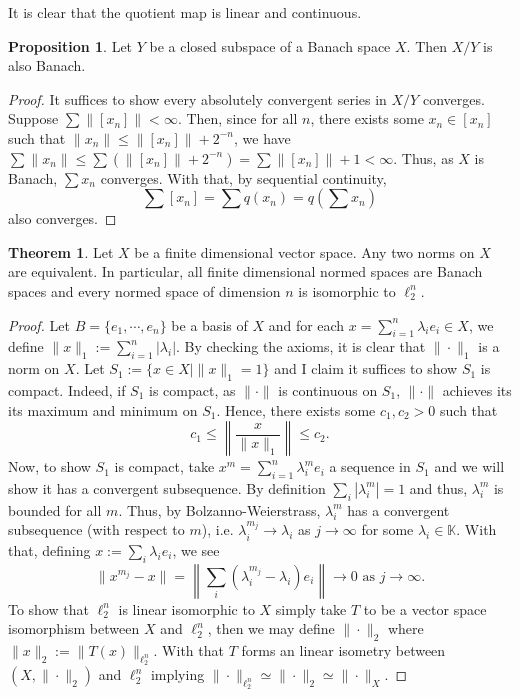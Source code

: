 \documentclass[
]{article}
\theoremstyle{definition}
\newtheorem{theorem}{Theorem}
\theoremstyle{definition}
\newtheorem{proposition}{Proposition}[section]
\begin{document}
It is clear that the quotient map is linear and continuous.

\begin{proposition}
  Let \(Y\) be a closed subspace of a Banach space \(X\). Then \(X / Y\) is also 
  Banach.
\end{proposition}
\begin{proof}
  It suffices to show every absolutely convergent series in \(X / Y\) converges. 
  Suppose \(\sum \|[x_n]\| < \infty\). Then, since for all \(n\), there exists 
  some \(x_n \in [x_n]\) such that \(\|x_n\| \le \|[x_n]\| + 2^{-n}\), we have 
  \(\sum \|x_n\| \le \sum (\|[x_n]\| + 2^{-n}) = \sum \|[x_n]\| + 1 < \infty\). 
  Thus, as \(X\) is Banach, \(\sum x_n\) converges. With that, by sequential 
  continuity, 
  \[\sum [x_n] = \sum q(x_n) = q\left(\sum x_n\right)\]
  also converges.
\end{proof}

\begin{theorem}\label{equiv}
  Let \(X\) be a finite dimensional vector space. Any two norms on \(X\) are 
  equivalent. In particular, all finite dimensional normed spaces are Banach 
  spaces and every normed space of dimension \(n\) is isomorphic to \(\ell^n_2\).
\end{theorem}
\begin{proof}
  Let \(B = \{e_1, \cdots, e_n\}\) be a basis of \(X\) and for each 
  \(x = \sum_{i = 1}^n \lambda_i e_i \in X\), we define 
  \(\|x\|_1 := \sum_{i = 1}^n |\lambda_i|\). By checking the axioms, it is 
  clear that \(\|\cdot\|_1\) is a norm on \(X\). Let \(S_1 := \{x \in X \mid \|x\|_1 = 1\}\) 
  and I claim it suffices to show \(S_1\) is compact. Indeed, if \(S_1\) is 
  compact, as \(\|\cdot\|\) is continuous on \(S_1\), \(\|\cdot\|\) achieves its 
  its maximum and minimum on \(S_1\). Hence, there exists some \(c_1, c_2 > 0\) 
  such that 
  \[c_1 \le \left\| \frac{x}{\|x\|_1}\right\| \le c_2.\]
  Now, to show \(S_1\) is compact, take \(x^m = \sum_{i = 1}^n \lambda_i^m e_i\) 
  a sequence in \(S_1\) and we will show it has a convergent subsequence. By 
  definition \(\sum_i |\lambda_i^m| = 1\) and thus, \(\lambda_i^m\) is bounded 
  for all \(m\). Thus, by Bolzanno-Weierstrass, \(\lambda_i^m\) has a convergent 
  subsequence (with respect to \(m\)), i.e. \(\lambda_i^{m_j} \to \lambda_i\) 
  as \(j \to \infty\) for some \(\lambda_i \in \mathbb{K}\). With that, 
  defining \(x := \sum_i \lambda_i e_i\), we see 
  \[\|x^{m_j} - x\| = \left\|\sum_i (\lambda_i^{m_j} - \lambda_i) e_i \right\| 
    \to 0 \text{ as } j \to \infty.\] 
  To show that \(\ell_2^n\) is linear isomorphic to \(X\) simply take \(T\) to 
  be a vector space isomorphism between \(X\) and \(\ell_2^n\), then we may 
  define \(\|\cdot\|_2\) where \(\|x\|_2 := \|T(x)\|_{\ell_2^n}\). With that 
  \(T\) forms an linear isometry between \((X, \|\cdot\|_2)\) and \(\ell_2^n\) 
  implying \(\|\cdot\|_{\ell_2^n} \simeq \|\cdot\|_2 \simeq \|\cdot\|_X\).
\end{proof}
\end{document}
